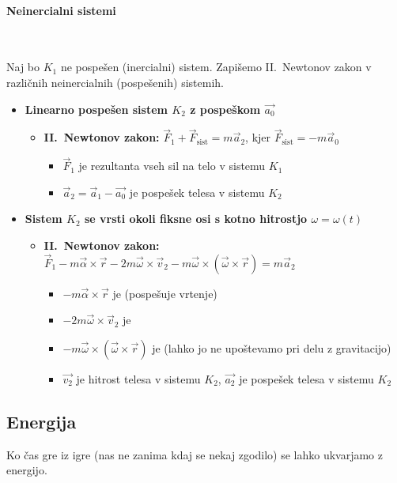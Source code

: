 \paragraph{Neinercialni sistemi} \ 

Naj bo \(K_1\) ne pospešen (inercialni) sistem. Zapišemo II.\ Newtonov zakon v različnih neinercialnih (pospešenih) sistemih.
\begin{itemize}
    \item \textbf{Linearno pospešen sistem \(K_2\) z pospeškom \(\vec{a_0}\)} 
   
   \begin{itemize}
    \item \textbf{II.\ Newtonov zakon:} \(\boxed{\vec{F}_1 + \vec{F}_\text{sist} = m \vec{a}_2}\), kjer \(\vec{F}_\text{sist} = - m \vec{a}_0\)
     \begin{itemize}
         \item \(\vec{F}_1\) je rezultanta vseh sil na telo v sistemu \(K_1\)
         \item \(\vec{a}_2 = \vec{a}_1 - \vec{a_0}\) je pospešek telesa v sistemu \(K_2\)
     \end{itemize}
   \end{itemize}
    \item \textbf{Sistem \(K_2\) se vrsti okoli fiksne osi s kotno hitrostjo \(\omega = \omega(t)\)}
    \begin{itemize}
        \item \textbf{II.\ Newtonov zakon:} \(\boxed{\vec{F}_1 - m \vec{\alpha} \times \vec{r} - 2m \vec{\omega} \times \vec{v}_2 - m \vec{\omega} \times (\vec{\omega} \times \vec{r}) = m \vec{a}_2}\)
        \begin{itemize}
            \item \(-m \vec{\alpha} \times \vec{r}\) je  (pospešuje vrtenje)
            \item \(-2m \vec{\omega} \times \vec{v}_2\) je 
            \item \(-m \vec{\omega} \times (\vec{\omega} \times \vec{r})\) je  (lahko jo ne upoštevamo pri delu z gravitacijo)
            \item \(\vec{v_2}\) je hitrost telesa v sistemu \(K_2\), \(\vec{a_2}\) je pospešek telesa v sistemu \(K_2\)
        \end{itemize}
    \end{itemize}
\end{itemize}

\newpage
\subsection{Energija}
Ko čas gre iz igre (nas ne zanima kdaj se nekaj zgodilo) se lahko ukvarjamo z energijo.
